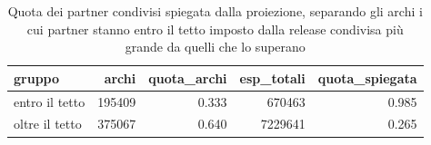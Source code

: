 \begin{table}
\centering
\caption{Quota dei partner condivisi spiegata dalla proiezione, separando gli archi i cui partner stanno entro il tetto imposto dalla release condivisa più grande da quelli che lo superano}
\label{tab:t4_proiezione_tetto}
\begin{tabular}{lrrrr}
\toprule
        gruppo &  archi &  quota\_archi &  esp\_totali &  quota\_spiegata \\
\midrule
entro il tetto & 195409 &        0.333 &      670463 &           0.985 \\
oltre il tetto & 375067 &        0.640 &     7229641 &           0.265 \\
\bottomrule
\end{tabular}
\end{table}
